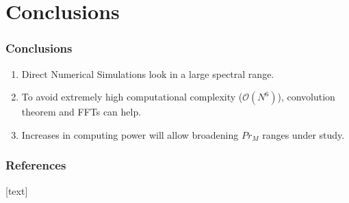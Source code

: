 \documentclass{beamer}
\begin{document}
 
 
 



\section{Conclusions}

\begin{frame}
 \frametitle{Conclusions}
 
 \begin{enumerate}
  \item<1-> Direct Numerical Simulations look in a large spectral range.
  \item<2-> To avoid extremely high computational complexity ($\mathcal{O}(N^6)$), convolution theorem and FFTs can help.
  \item<3-> Increases in computing power will allow broadening $Pr_M$ ranges under study.
 \end{enumerate}
 
\end{frame}

\begin{frame}
\frametitle{References}

[text]




\end{frame}
\end{document}
